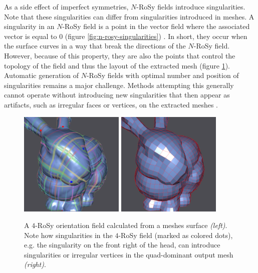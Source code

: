 \documentclass{ACGSeminar}
\begin{document}
As a side effect of imperfect symmetries, $N$-RoSy fields introduce singularities. Note that these singularities can differ from singularities introduced in meshes. A singularity in an $N$-RoSy field is a point in the vector field where the associated vector is equal to 0 (figure \ref{fig:n-rosy-singularities}) \cite{palacios2007rotational}. In short, they occur when the surface curves in a way that break the directions of the $N$-RoSy field. However, because of this property, they are also the points that control the topology of the field and thus the layout of the extracted mesh (figure \ref{fig:n-rosy-geometry}). Automatic generation of $N$-RoSy fields with optimal number and position of singularities remains a major challenge. Methods attempting this generally cannot operate without introducing new singularities that then appear as artifacts, such as irregular faces or vertices, on the extracted meshes \cite{lai2009metric}.

\begin{figure}[htb!]
	\begin{centering}
		\includegraphics[width=5cm]{img/n-Rosy-orientation.png} \includegraphics[width=5cm]{img/n-Rosy-Mesh.png}\par
	\end{centering}
	\caption{A $4$-RoSy orientation field calculated from a meshes surface \textit{(left)}. Note how singularities in the $4$-RoSy field (marked as colored dots), e.g. the singularity on the front right of the head, can introduce singularities or irregular vertices in the quad-dominant output mesh \textit{(right)}.}
	\label{fig:n-rosy-geometry}
\end{figure}
\end{document}
